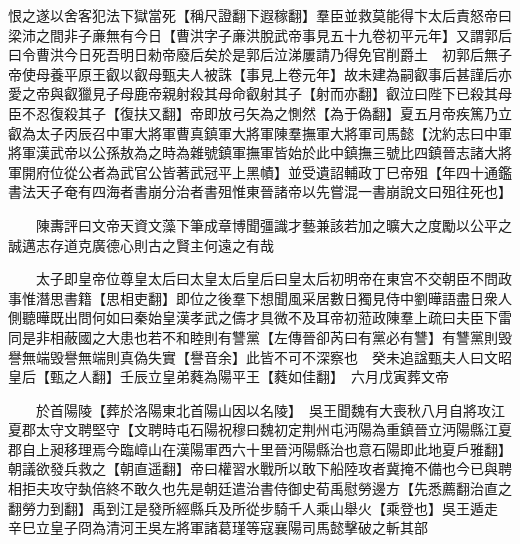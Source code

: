 恨之遂以舍客犯法下獄當死【稱尺證翻下遐稼翻】羣臣並救莫能得卞太后責怒帝曰梁沛之間非子亷無有今日【曹洪字子亷洪脫武帝事見五十九卷初平元年】又謂郭后曰令曹洪今日死吾明日勑帝廢后矣於是郭后泣涕屢請乃得免官削爵土　初郭后無子帝使母養平原王叡以叡母甄夫人被誅【事見上卷元年】故未建為嗣叡事后甚謹后亦愛之帝與叡獵見子母鹿帝親射殺其母命叡射其子【射而亦翻】叡泣曰陛下已殺其母臣不忍復殺其子【復扶又翻】帝即放弓矢為之惻然【為于偽翻】夏五月帝疾篤乃立叡為太子丙辰召中軍大將軍曹真鎮軍大將軍陳羣撫軍大將軍司馬懿【沈約志曰中軍將軍漢武帝以公孫敖為之時為雜號鎮軍撫軍皆始於此中鎮撫三號比四鎮晉志諸大將軍開府位從公者為武官公皆著武冠平上黑幘】並受遺詔輔政丁巳帝殂【年四十通鑑書法天子奄有四海者書崩分治者書殂惟東晉諸帝以先嘗混一書崩說文曰殂往死也】

　　陳夀評曰文帝天資文藻下筆成章博聞彊識才藝兼該若加之曠大之度勵以公平之誠邁志存道克廣德心則古之賢主何遠之有哉

　　太子即皇帝位尊皇太后曰太皇太后皇后曰皇太后初明帝在東宫不交朝臣不問政事惟潛思書籍【思相吏翻】即位之後羣下想聞風采居數日獨見侍中劉曄語盡日衆人側聽曄既出問何如曰秦始皇漢孝武之儔才具微不及耳帝初蒞政陳羣上疏曰夫臣下雷同是非相蔽國之大患也若不和睦則有讐黨【左傳晉卻芮曰有黨必有讐】有讐黨則毁譽無端毁譽無端則真偽失實【譽音余】此皆不可不深察也　癸未追諡甄夫人曰文昭皇后【甄之人翻】壬辰立皇弟蕤為陽平王【蕤如佳翻】　六月戊寅葬文帝

　　於首陽陵【葬於洛陽東北首陽山因以名陵】　吳王聞魏有大喪秋八月自將攻江夏郡太守文聘堅守【文聘時屯石陽祝穆曰魏初定荆州屯沔陽為重鎮晉立沔陽縣江夏郡自上昶移理焉今臨嶂山在漢陽軍西六十里晉沔陽縣治也意石陽即此地夏戶雅翻】朝議欲發兵救之【朝直遥翻】帝曰權習水戰所以敢下船陸攻者冀掩不備也今已與聘相拒夫攻守埶倍終不敢久也先是朝廷遣治書侍御史荀禹慰勞邊方【先悉薦翻治直之翻勞力到翻】禹到江是發所經縣兵及所從步騎千人乘山舉火【乘登也】吳王遁走　辛巳立皇子冏為清河王吳左將軍諸葛瑾等寇襄陽司馬懿擊破之斬其部

